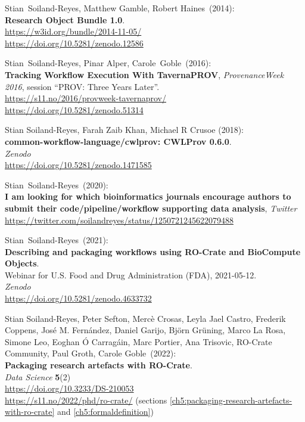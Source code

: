 \begin{thebibliography}{9}
Stian~Soiland-Reyes, Matthew Gamble, Robert Haines~(2014):\\
\textbf{Research Object Bundle 1.0}.\\
\url{https://w3id.org/bundle/2014-11-05/}\\
\url{https://doi.org/10.5281/zenodo.12586}

Stian~Soiland-Reyes, Pinar Alper, Carole~Goble~(2016):\\
\textbf{Tracking Workflow Execution With TavernaPROV},
\emph{ProvenanceWeek 2016}, session ``PROV: Three Years Later''.\\
\url{https://s11.no/2016/provweek-tavernaprov/}\\
\url{https://doi.org/10.5281/zenodo.51314}

Stian Soiland-Reyes, Farah Zaib Khan, Michael R Crusoe (2018):\\
\textbf{common-workflow-language/cwlprov: CWLProv 0.6.0}.\\
\emph{Zenodo}\\
\url{https://doi.org/10.5281/zenodo.1471585}

Stian~Soiland-Reyes~(2020):\\
\textbf{I am looking for which bioinformatics journals encourage authors
to submit their code/pipeline/workflow supporting data analysis},
\emph{Twitter}\\
\url{https://twitter.com/soilandreyes/status/1250721245622079488}

Stian~Soiland-Reyes~(2021):\\
\textbf{Describing and packaging workflows using RO-Crate and BioCompute Objects}.\\
Webinar for U.S. Food and Drug Administration
(FDA), 2021-05-12.\\
\emph{Zenodo}\\
\url{https://doi.org/10.5281/zenodo.4633732}

Stian Soiland-Reyes, Peter Sefton, Mercè
Crosas, Leyla Jael Castro, Frederik Coppens, José M. Fernández, Daniel
Garijo, Björn Grüning, Marco La Rosa, Simone Leo, Eoghan Ó Carragáin,
Marc Portier, Ana Trisovic, RO-Crate Community, Paul Groth, Carole Goble~(2022):\\
\textbf{Packaging research artefacts with RO-Crate}.\\
\emph{Data Science} \textbf{5}(2)\\
\url{https://doi.org/10.3233/DS-210053}\\
\url{https://s11.no/2022/phd/ro-crate/}
(sections \vref{ch5:packaging-research-artefacts-with-ro-crate} and \vref{ch5:formaldefinition})


\end{thebibliography}
